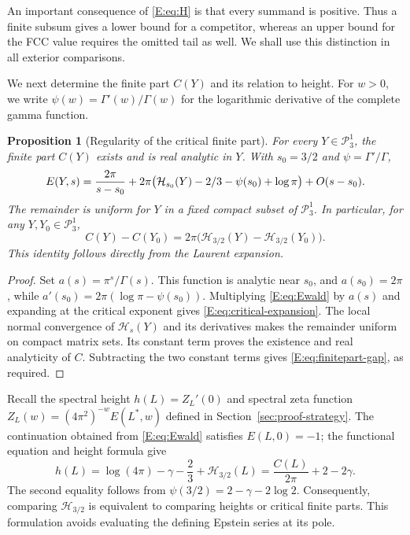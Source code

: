 \documentclass[reqno,english]{amsart}
\newtheorem{proposition}[theorem]{Proposition}
\theoremstyle{definition}
\newtheorem{open problem}[theorem]{Open Problem}
\theoremstyle{remark}
\theoremstyle{plain}
\numberwithin{equation}{section}
\newcommand{\HH}{\mathcal H}
\newcommand{\PP}{\mathcal P_3^1}
\begin{document}
An important consequence of \eqref{E:eq:H} is that every summand is
positive. Thus a finite subsum gives a lower bound for a competitor,
whereas an upper bound for the FCC value requires the omitted tail as
well. We shall use this distinction in all exterior comparisons.

We next determine the finite part $C(Y)$ and its relation to height.
For $w>0$, we write $\psi(w)=\Gamma'(w)/\Gamma(w)$ for the logarithmic
derivative of the complete gamma function.
\begin{proposition}[Regularity of the critical finite part]\label{E:prop:finitepart}
For every $Y\in\PP$, the finite part $C(Y)$ exists and is real analytic in
$Y$. With $s_0=3/2$ and $\psi=\Gamma'/\Gamma$,
\begin{equation}\label{E:eq:critical-expansion}
 E(Y,s)={}\frac{2\pi}{s-s_0}\notag
 +2\pi\bigl(\HH_{s_0}(Y)-2/3-\psi(s_0)+\log\pi\bigr)
   +O(s-s_0).
\end{equation}
The remainder is uniform for $Y$ in a fixed compact subset of $\PP$.
In particular, for any $Y,Y_0\in\PP$,
\begin{equation}\label{E:eq:finitepart-gap}
 C(Y)-C(Y_0)=2\pi\bigl(\HH_{3/2}(Y)-\HH_{3/2}(Y_0)\bigr).
\end{equation}
This identity follows directly from the Laurent expansion.
\end{proposition}
\begin{proof}
Set $a(s)=\pi^s/\Gamma(s)$. This function is analytic near $s_0$, and
$a(s_0)=2\pi$, while $a'(s_0)=2\pi(\log\pi-\psi(s_0))$.
Multiplying \eqref{E:eq:Ewald} by $a(s)$ and expanding at the critical
exponent gives \eqref{E:eq:critical-expansion}. The local normal
convergence of $\HH_s(Y)$ and its derivatives makes the remainder
uniform on compact matrix sets. Its constant term proves the existence
and real analyticity of $C$. Subtracting the two constant terms gives
\eqref{E:eq:finitepart-gap}, as required.
\end{proof}

Recall the spectral height $h(L)=Z_L'(0)$ and spectral zeta function
$Z_L(w)=(4\pi^2)^{-w}E(L^*,w)$ defined in Section~\ref{sec:proof-strategy}.
The continuation obtained
from \eqref{E:eq:Ewald} satisfies $E(L,0)=-1$; the functional equation
\cite[(2)]{SS} and height formula \cite[(26)]{SS} give
\begin{equation}
 h(L)=\log(4\pi)-\gamma-\frac23+\HH_{3/2}(L)
      =\frac{C(L)}{2\pi}+2-2\gamma.
 \label{E:eq:height-finitepart}
\end{equation}
The second equality follows from $\psi(3/2)=2-\gamma-2\log2$.
Consequently, comparing $\HH_{3/2}$ is equivalent to comparing heights
or critical finite parts. This formulation avoids evaluating the
defining Epstein series at its pole.
\end{document}
